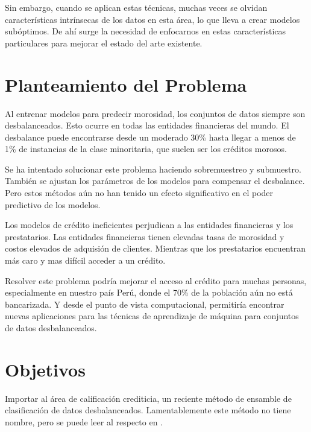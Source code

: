 Sin embargo, cuando se aplican estas técnicas, muchas veces se olvidan características intrínsecas de los datos en esta área, lo que lleva a crear modelos subóptimos. De ahí surge la necesidad de enfocarnos en estas características particulares para mejorar el estado del arte existente.

\section{Planteamiento del Problema}

Al entrenar modelos para predecir morosidad, los conjuntos de datos siempre son desbalanceados. Esto ocurre en todas las entidades financieras del mundo. El desbalance puede encontrarse desde un moderado 30\% hasta llegar a menos de 1\% de instancias de la clase minoritaria, que suelen ser los créditos morosos.

Se ha intentado solucionar este problema haciendo sobremuestreo y submuestro. También se ajustan los parámetros de los modelos para compensar el desbalance. Pero estos métodos aún no han tenido un efecto significativo en el poder predictivo de los modelos.

Los modelos de crédito ineficientes perjudican a las entidades financieras y los prestatarios. Las entidades financieras tienen elevadas tasas de morosidad y costos elevados de adquisión de clientes. Mientras que los prestatarios encuentran más caro y mas difícil acceder a un crédito.

Resolver este problema podría mejorar el acceso al crédito para muchas personas, especialmente en nuestro país Perú, donde el 70\% de la población aún no está bancarizada. Y desde el punto de vista computacional, permitiría encontrar nuevas aplicaciones para las técnicas de aprendizaje de máquina para conjuntos de datos desbalanceados.


\section{Objetivos}

Importar al área de calificación crediticia, un reciente método de ensamble de clasificación de datos desbalanceados. Lamentablemente este método no tiene nombre, pero se puede leer al respecto en \citep{sun2015novel}.

